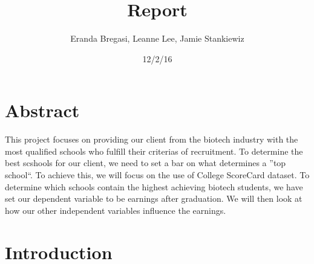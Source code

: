 \documentclass{article}
\begin{document}
\title{Report}
\author{Eranda Bregasi, Leanne Lee, Jamie Stankiewiz}
\date{12/2/16}
\maketitle






\section{Abstract}

  This project focuses on providing our client from the biotech industry with the most qualified schools who fulfill their criterias of recruitment.  To determine the best scshools for our client, we need to set a bar on what determines a ''top school``.  To achieve this, we will focus on the use of College ScoreCard dataset.  To determine which schools contain the highest achieving biotech students, we have set our dependent variable to be earnings after graduation.  We will then look at how our other independent variables influence the earnings. 

\section{Introduction}
\end{document}
